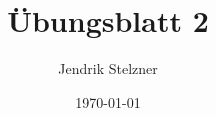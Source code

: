 \documentclass[a4paper, 10pt, numbers = noenddot]{scrartcl}
\title{Übungsblatt 2}
\author{Jendrik Stelzner}
\date{\today}
\begin{document}
\maketitle





\begin{appendices}

\end{appendices}
\end{document}
